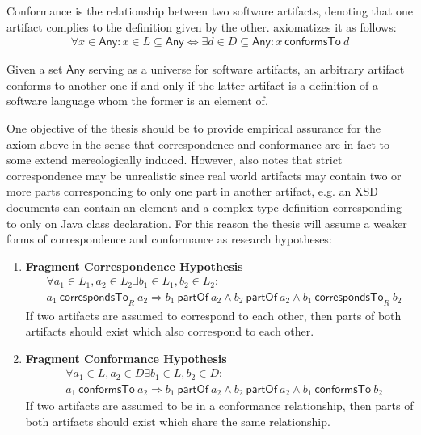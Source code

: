 \documentclass[runningheads,a4paper]{llncs}
\newcommand{\Any}{\textsf{Any}}
\newcommand{\partOf}{~\textsf{partOf}~}
\newcommand{\correspondsToR}[1]{~\textsf{correspondsTo}_{#1}~}
\newcommand{\conformsTo}{~\textsf{conformsTo}~}
\begin{document}
Conformance is the relationship between two software artifacts, denoting that one artifact complies to the definition given by the other.
\cite{DBLP:conf/sle/Lammel16} axiomatizes it as follows:
\begin{align*}
\forall x \in \Any :
x \in L \subseteq \Any \Leftrightarrow \exists d \in D \subseteq \Any : x \conformsTo d
\end{align*}

Given a set $\Any$ serving as a universe for software artifacts, an arbitrary artifact conforms to another one if and only if the latter artifact is a definition of a software language whom the former is an element of.

One objective of the thesis should be to provide empirical assurance for the axiom above in the sense that correspondence and conformance are in fact to some extend mereologically induced.
However, \cite{DBLP:conf/sle/Lammel16} also notes that strict correspondence may be unrealistic since real world artifacts may contain two or more parts corresponding to only one part in another artifact, e.g. an XSD documents can contain an element and a complex type definition corresponding to only on Java class declaration.
For this reason the thesis will assume a weaker forms of correspondence and conformance as research hypotheses:
\begin{enumerate}[RH1]
\item
\textbf{Fragment Correspondence Hypothesis}
\begin{align*}
&\forall a_1 \in L_1, a_2 \in L_2 \exists b_1 \in L_1, b_2 \in L_2 :  
\\&a_1 \correspondsToR{R} a_2
\Rightarrow 
b_1 \partOf a_2 
\wedge b_2 \partOf a_2
\wedge b_1 \correspondsToR{R} b_2
\end{align*}
If two artifacts are assumed to correspond to each other, then parts of both artifacts should exist which also correspond to each other.

\item
\textbf{Fragment Conformance Hypothesis}
\begin{align*}
&\forall a_1 \in L, a_2 \in D \exists b_1 \in L, b_2 \in D : 
\\&a_1 \conformsTo a_2
\Rightarrow 
b_1 \partOf a_2
\wedge b_2 \partOf a_2
\wedge b_1 \conformsTo b_2
\end{align*}
If two artifacts are assumed to be in a conformance relationship, then parts of both artifacts should exist which share the same relationship.
\end{enumerate}
\end{document}
